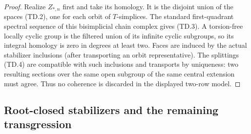 \begin{proof}
Realize $Z_{*,n}$ first and take its homology. It is the disjoint
union of the spaces (TD.2), one for each orbit of $T$-simplices.
The standard first-quadrant spectral sequence of this bisimplicial
chain complex gives (TD.3). A torsion-free locally cyclic group
is the filtered union of its infinite cyclic subgroups, so its
integral homology is zero in degrees at least two.
Faces are induced by the actual stabilizer inclusions (after
transporting an orbit representative). The splittings (TD.4)
are compatible with such inclusions and transports by uniqueness:
two resulting sections over the same open subgroup of the same
central extension must agree. Thus no coherence is discarded
in the displayed two-row model.
\end{proof}


\subsection{Root-closed stabilizers and the remaining transgression}

